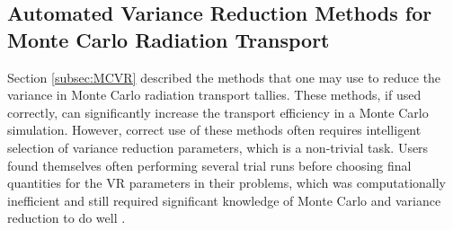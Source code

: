\subsection{Automated Variance Reduction Methods for Monte Carlo Radiation
Transport}
\label{subsec:AutomatedMCVR}

Section \ref{subsec:MCVR} described the methods that one may use to reduce the
variance in Monte Carlo radiation transport tallies. These methods, if used
correctly, can significantly increase the transport efficiency in a Monte Carlo
simulation. However, correct use of these methods often requires intelligent
selection of variance reduction parameters, which is a non-trivial task. Users
found themselves often performing several trial runs before choosing final
quantities for the VR parameters in their problems, which was computationally
inefficient and still required significant knowledge of Monte Carlo and variance
reduction to do well \cite{booth_automatic_1982}.

